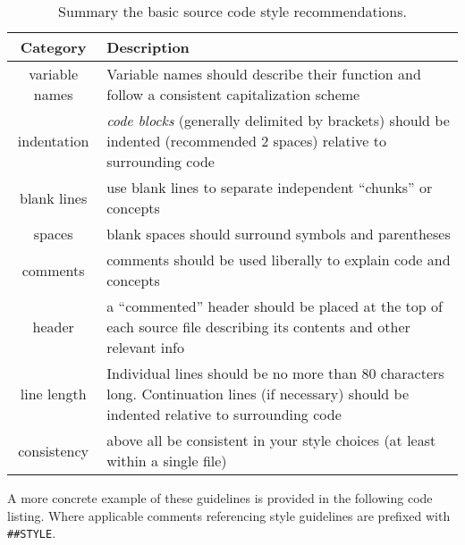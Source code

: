 \documentclass[10pt,letterpaper]{article}
\begin{document}
\begin{table}[htbp]
  \begin{center}
    \begin{tabular}{cp{8cm}}
      \toprule
      Category & Description \\
      \midrule
      variable names & Variable names should describe their function and follow a consistent capitalization scheme \\
      indentation & \emph{code blocks} (generally delimited by brackets) should be indented (recommended 2 spaces) relative to surrounding code \\
      blank lines & use blank lines to separate independent ``chunks'' or concepts \\
      spaces & blank spaces should surround symbols and parentheses \\
      comments & comments should be used liberally to explain code and concepts \\
      header & a ``commented'' header should be placed at the top of each source file describing its contents and other relevant info \\
      line length & Individual lines should be no more than 80 characters long.  Continuation lines (if necessary) should be indented relative to surrounding code \\
      consistency & above all be consistent in your style choices (at least within a single file) \\
      \bottomrule
    \end{tabular}
    \caption{\label{tab:style_table}Summary the basic \R source code style recommendations.}
  \end{center}
\end{table}

A more concrete example of these guidelines is provided in the following code listing.  Where applicable comments referencing style guidelines are prefixed with \texttt{\#\#STYLE}.
\end{document}
